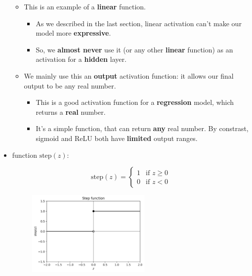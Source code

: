 \begin{itemize}
\begin{itemize}
                    \item This is an example of a \textbf{linear} function.
                        \begin{itemize}
                            \item As we described in the last section, linear activation can't make our model more \textbf{expressive}.
                            \item So, we \textbf{almost never} use it (or any other \textbf{linear} function) as an activation for a \textbf{hidden} layer.
                        \end{itemize}
                    \item We mainly use this an \textbf{output} activation function: it allows our final output to be any real number.
                        \begin{itemize}
                            \item This is a good activation function for a \textbf{regression} model, which returns a \textbf{real} number.
                            \item It's a simple function, that can return \textbf{any} real number. By constrast, sigmoid and ReLU both have \textbf{limited} output ranges.
                        \end{itemize}
                \end{itemize}

            
            \item {} function $\text{step}(z)$:
            
                \begin{equation}
                    \text{step}(z) 
                    =
                    \begin{cases}
                      1 & \text{if $z \geq 0$}\\
                      0 & \text{if $z < 0$}
                    \end{cases}
                \end{equation}
                
                \begin{figure}[H]
                    \centering
                    \includegraphics[width=60mm,scale=0.4]{images/nn_images/step_fn.png}
                \end{figure}
                

\end{itemize}
